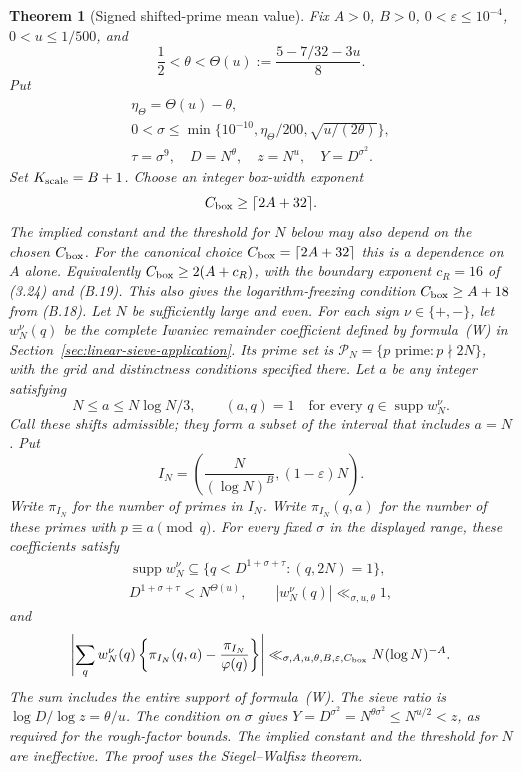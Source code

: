 \documentclass{amsart}
\newtheorem{theorem}{Theorem}[section]
\numberwithin{equation}{section}
\theoremstyle{definition}
\theoremstyle{plain}
\begin{document}
\begin{theorem}[Signed shifted-prime mean value]
\label{thm:aa37-interior}
Fix $A>0$, $B>0$, $0<\varepsilon\le10^{-4}$, $0<u\le1/500$,
and
\[
 \frac12<\theta<\Theta(u):=\frac{5-7/32-3u}{8}.
\]
Put
\[
 \begin{gathered}
 \eta_\Theta=\Theta(u)-\theta,\\
 0<\sigma\le\min\{10^{-10},\eta_\Theta/200,
                   \sqrt{u/(2\theta)}\},\\
 \tau=\sigma^9,\quad D=N^\theta,\quad z=N^u,
 \quad Y=D^{\sigma^2}.
 \end{gathered}
\]
Set $K_{\rm scale}=B+1$. Choose an integer box-width exponent
\[
 C_{\rm box}\ge\lceil2A+32\rceil.
\]
The implied constant and the threshold for $N$ below may also depend
on the chosen $C_{\rm box}$. For the canonical choice
$C_{\rm box}=\lceil2A+32\rceil$ this is a dependence on $A$ alone.
Equivalently $C_{\rm box}\ge2(A+c_R)$, with the boundary exponent
$c_R=16$ of (3.24) and (B.19). This also gives the logarithm-freezing
condition $C_{\rm box}\ge A+18$ from (B.18).
Let $N$ be sufficiently large and even. For each sign
$\nu\in\{+,-\}$, let $w_N^\nu(q)$ be the complete Iwaniec
remainder coefficient defined by formula~\textup{(W)} in
Section~\ref{sec:linear-sieve-application}. Its prime set is
$\mathcal P_N=\{p\text{ prime}:p\nmid2N\}$, with the
grid and distinctness conditions specified there. Let $a$ be any
integer satisfying
\[
 N\le a\le N\log N/3,\qquad
 (a,q)=1\quad\text{for every }q\in\operatorname{supp}w_N^\nu.
\]
Call these shifts admissible; they form a subset of the interval that includes
$a=N$.
Put
\[
 I_N=\left(\frac{N}{(\log N)^B},(1-\varepsilon)N\right).
\]
Write $\pi_{I_N}$ for the number of primes in $I_N$.
Write $\pi_{I_N}(q,a)$ for the number of these primes with
$p\equiv a\pmod q$.
For every fixed $\sigma$ in the displayed range, these coefficients
satisfy
\[
 \begin{gathered}
 \operatorname{supp}w_N^\nu\subseteq
 \{q<D^{1+\sigma+\tau}:(q,2N)=1\},
 \\ D^{1+\sigma+\tau}<N^{\Theta(u)},
 \qquad |w_N^\nu(q)|\ll_{\sigma,u,\theta}1,
 \end{gathered}
\]
and
\begin{equation}\label{eq:aa37-interior-mean}
 \left|\sum_q w_N^\nu(q)
  \left\{\pi_{I_N}(q,a)-\frac{\pi_{I_N}}{\varphi(q)}\right\}\right|
 \ll_{\sigma,A,u,\theta,B,\varepsilon,C_{\rm box}} N(\log N)^{-A}.
\end{equation}
The sum includes the entire support of formula~\textup{(W)}.
The sieve ratio is $\log D/\log z=\theta/u$. The condition on
$\sigma$ gives $Y=D^{\sigma^2}=N^{\theta\sigma^2}\le N^{u/2}<z$,
as required for the rough-factor bounds.
The implied constant and the threshold for $N$ are ineffective.
The proof uses the Siegel--Walfisz theorem.
\end{theorem}
\end{document}
